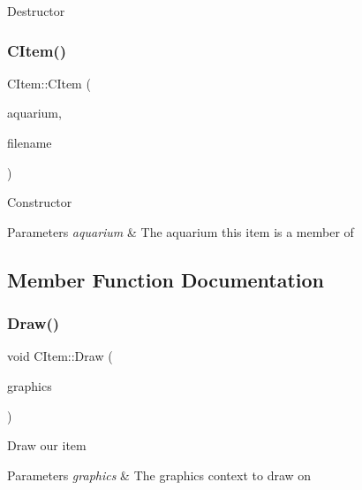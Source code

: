 Destructor \mbox{\label{class_c_item_a376d86b9ee99285ec157f1fb3a5e1e35}} 
\subsubsection{\texorpdfstring{C\+Item()}{CItem()}}
{\footnotesize\ttfamily C\+Item\+::\+C\+Item (\begin{DoxyParamCaption}\item[{\mbox{\hyperlink{class_c_aquarium}{C\+Aquarium}} $\ast$}]{aquarium,  }\item[{const std\+::wstring \&}]{filename }\end{DoxyParamCaption})\hspace{0.3cm}{\ttfamily [protected]}}

Constructor 
\begin{DoxyParams}{Parameters}
{\em aquarium} & The aquarium this item is a member of \\
\hline
\end{DoxyParams}


\subsection{Member Function Documentation}
\mbox{\label{class_c_item_acfad712746a2da68669c38f5704b3243}} 
\subsubsection{\texorpdfstring{Draw()}{Draw()}}
{\footnotesize\ttfamily void C\+Item\+::\+Draw (\begin{DoxyParamCaption}\item[{Gdiplus\+::\+Graphics $\ast$}]{graphics }\end{DoxyParamCaption})\hspace{0.3cm}{\ttfamily [virtual]}}

Draw our item 
\begin{DoxyParams}{Parameters}
{\em graphics} & The graphics context to draw on \\
\hline
\end{DoxyParams}
\mbox{\label{class_c_item_a831327c8bf6c2671cddb0ae4c9339e47}} 

